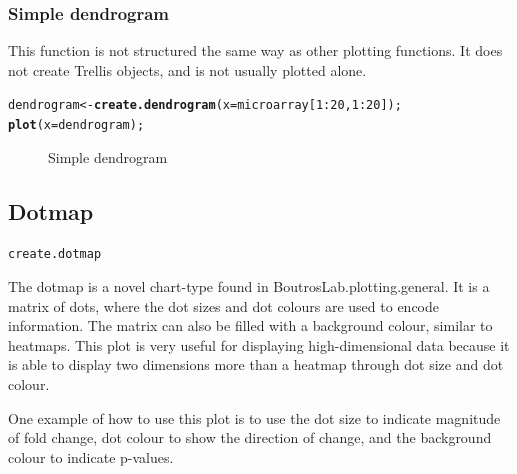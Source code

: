 \documentclass[letterpaper]{report}\usepackage[]{graphicx}\usepackage[]{color}
\makeatletter
\newcommand{\hlnum}[1]{\textcolor[rgb]{0.686,0.059,0.569}{#1}}%
\newcommand{\hlopt}[1]{\textcolor[rgb]{0,0,0}{#1}}%
\newcommand{\hlstd}[1]{\textcolor[rgb]{0.345,0.345,0.345}{#1}}%
\newcommand{\hlkwb}[1]{\textcolor[rgb]{0.69,0.353,0.396}{#1}}%
\newcommand{\hlkwc}[1]{\textcolor[rgb]{0.333,0.667,0.333}{#1}}%
\newcommand{\hlkwd}[1]{\textcolor[rgb]{0.737,0.353,0.396}{\textbf{#1}}}%
\newenvironment{kframe}{%
 \def\at@end@of@kframe{}%
 \ifinner\ifhmode%
  \def\at@end@of@kframe{\end{minipage}}%
  \begin{minipage}{\columnwidth}%
 \fi\fi%
 \def\FrameCommand##1{\hskip\@totalleftmargin \hskip-\fboxsep
 \colorbox{shadecolor}{##1}\hskip-\fboxsep
     \hskip-\linewidth \hskip-\@totalleftmargin \hskip\columnwidth}%
 \MakeFramed {\advance\hsize-\width
   \@totalleftmargin\z@ \linewidth\hsize
   \@setminipage}}%
 {\par\unskip\endMakeFramed%
 \at@end@of@kframe}
\newenvironment{knitrout}{}{} %
\makeatother
\begin{document}
\subsubsection{Simple dendrogram}
This function is not structured the same way as other plotting functions. It does not create Trellis objects, and is not usually plotted alone.

\begin{knitrout}
\color{fgcolor}\begin{kframe}
\begin{alltt}
\hlstd{dendrogram} \hlkwb{<-} \hlkwd{create.dendrogram}\hlstd{(}\hlkwc{x} \hlstd{= microarray[}\hlnum{1}\hlopt{:}\hlnum{20}\hlstd{,} \hlnum{1}\hlopt{:}\hlnum{20}\hlstd{]);}
\hlkwd{plot}\hlstd{(}\hlkwc{x} \hlstd{= dendrogram);}
\end{alltt}
\end{kframe}\begin{figure}

{\centering {} 

}

\caption[Simple dendrogram]{Simple dendrogram}\label{fig:dendrogram}
\end{figure}


\end{knitrout}

\subsection{Dotmap}
\begin{verbatim}
create.dotmap
\end{verbatim}

The dotmap is a novel chart-type found in BoutrosLab.plotting.general. It is a matrix of dots, where the dot sizes and dot colours are used to encode information. The matrix can also be filled with a background colour, similar to heatmaps. This plot is very useful for displaying high-dimensional data because it is able to display two dimensions more than a heatmap through dot size and dot colour.

One example of how to use this plot is to use the dot size to indicate magnitude of fold change, dot colour to show the direction of change, and the background colour to indicate p-values.
\end{document}
